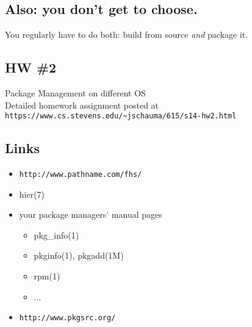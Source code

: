 \documentclass[xga]{xdvislides}
\begin{document}
\subsection{Also: you don't get to choose.}
\Huge
\vfill
\begin{center}
	You regularly have to do both: build from source {\em and} package it.
\end{center}
\vfill
\Normalsize

\subsection{HW \#2}

Package Management on different OS
\\

Detailed homework assignment posted at
\verb+https://www.cs.stevens.edu/~jschauma/615/s14-hw2.html+


\subsection{Links}
\begin{itemize}
	\item \verb+http://www.pathname.com/fhs/+
	\item hier(7)
	\item your package managers' manual pages
		\begin{itemize}
			\item pkg\_info(1)
			\item pkginfo(1), pkgadd(1M)
			\item rpm(1)
			\item ...
		\end{itemize}
	\item \verb+http://www.pkgsrc.org/+
\end{itemize}
\end{document}
